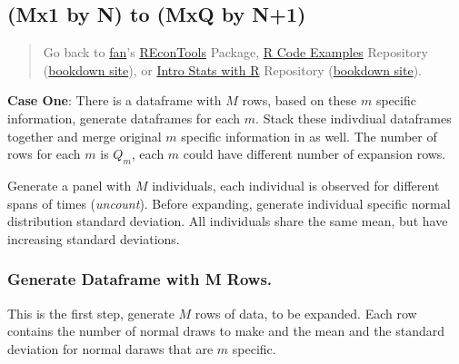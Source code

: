 \documentclass[
]{book}
\begin{document}
\hypertarget{mx1-by-n-to-mxq-by-n1}{%
\subsection{(Mx1 by N) to (MxQ by N+1)}\label{mx1-by-n-to-mxq-by-n1}}

\begin{quote}
Go back to \href{http://fanwangecon.github.io/}{fan}'s \href{https://fanwangecon.github.io/REconTools/}{REconTools} Package, \href{https://fanwangecon.github.io/R4Econ/}{R Code Examples} Repository (\href{https://fanwangecon.github.io/R4Econ/bookdown}{bookdown site}), or \href{https://fanwangecon.github.io/Stat4Econ/}{Intro Stats with R} Repository (\href{https://fanwangecon.github.io/Stat4Econ/bookdown}{bookdown site}).
\end{quote}

\textbf{Case One}: There is a dataframe with \(M\) rows, based on these \(m\) specific information, generate dataframes for each \(m\). Stack these indivdiual dataframes together and merge original \(m\) specific information in as well. The number of rows for each \(m\) is \(Q_m\), each \(m\) could have different number of expansion rows.

Generate a panel with \(M\) individuals, each individual is observed for different spans of times (\emph{uncount}). Before expanding, generate individual specific normal distribution standard deviation. All individuals share the same mean, but have increasing standard deviations.

\hypertarget{generate-dataframe-with-m-rows.}{%
\subsubsection{Generate Dataframe with M Rows.}\label{generate-dataframe-with-m-rows.}}

This is the first step, generate \(M\) rows of data, to be expanded. Each row contains the number of normal draws to make and the mean and the standard deviation for normal daraws that are \(m\) specific.
\end{document}
